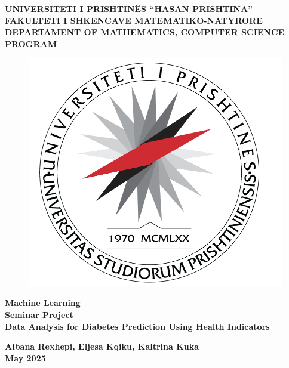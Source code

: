 \clearpage
\thispagestyle{empty}

\begin{normalsize}
    \begin{center}
        \textbf{UNIVERSITETI I PRISHTINËS “HASAN PRISHTINA” \\
        FAKULTETI I SHKENCAVE MATEMATIKO-NATYRORE\\
        DEPARTAMENT OF MATHEMATICS, COMPUTER SCIENCE PROGRAM}
      \vspace{0.5in}
        
        \begin{figure}[h]
             \center
            \includegraphics[scale=0.4]{images/up_logo.png}
        \end{figure}
        \vspace{0.5in}
        
        \Large{\textbf{Machine Learning \\ Seminar Project\\ Data Analysis for Diabetes Prediction Using Health Indicators}}
    \end{center}
\vspace{1in}

\setlength{\parindent}{7cm}

\begin{center}
    \textbf{Albana Rexhepi, Eljesa Kqiku, Kaltrina Kuka}\\ 
    \vspace{0.2cm}
  \textbf{May 2025}  
\end{center}
\end{normalsize}
\newpage